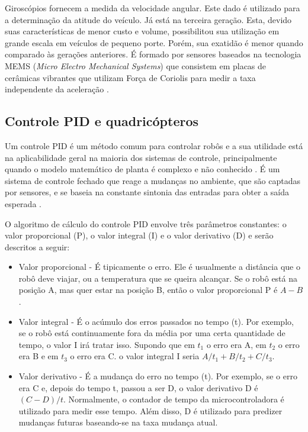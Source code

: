 \documentclass[a4paper, 12pt]{article}
\begin{document}
Giroscópios fornecem a medida da velocidade angular. Este dado é utilizado para a determinação da atitude do veículo. Já está na terceira geração. Esta, devido suas características de menor custo e volume, possibilitou sua utilização em grande escala em veículos de pequeno porte. Porém, sua exatidão é menor quando comparado às gerações anteriores. É formado por sensores baseados na tecnologia MEMS (\textit{Micro Electro Mechanical Systems}) que consistem em placas de cerâmicas vibrantes que utilizam Força de Coriolis para medir a taxa independente da aceleração \cite{Adalberto2009}.

\subsection{Controle PID e quadricópteros}

Um controle PID é um método comum para controlar robôs e a sua utilidade está na aplicabilidade geral na maioria dos sistemas de controle, principalmente quando o modelo matemático de planta é complexo e não conhecido \cite{Ogata2003}. É um sistema de controle fechado que reage a mudanças no ambiente, que são captadas por sensores, e se baseia na constante sintonia das entradas para obter a saída esperada \cite{Kingdom}.  

O algoritmo de cálculo do controle PID envolve três parâmetros constantes: o valor proporcional (P), o valor integral (I) e o valor derivativo (D) e serão descritos a seguir:

\begin{itemize}
\item
Valor proporcional - É tipicamente o erro. Ele é usualmente a distância que o robô deve viajar, ou a temperatura que se queira alcançar. Se o robô está na posição A, mas quer estar na posição B, então o valor proporcional P é $A - B$.
\item
Valor integral - É o acúmulo dos erros passados no tempo (t). Por exemplo, se o robô está continuamente fora da média por uma certa quantidade de tempo, o valor I irá tratar isso. Supondo que em $t_1$ o erro era A, em $t_2$ o erro era B e em $t_3$ o erro era C. o valor integral I seria $A/t_1 + B/t_2 + C/t_3$.
\item
Valor derivativo - É a mudança do erro no tempo (t). Por exemplo, se o erro era C e, depois do tempo t, passou a ser D, o valor derivativo D é $(C-D)/t$. Normalmente, o contador de tempo da microcontroladora é utilizado para medir esse tempo. Além disso, D é utilizado para predizer mudanças futuras baseando-se na taxa mudança atual.
\end{itemize}
\end{document}
